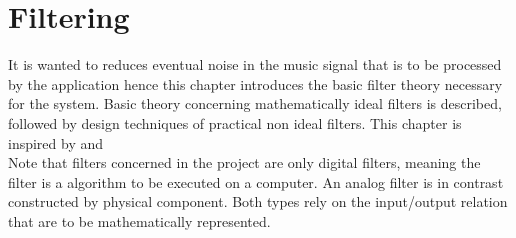 \chapter{Filtering} \label{ch7}
It is wanted to reduces eventual noise in the music signal that is to be processed by the application hence this chapter introduces the basic filter theory necessary for the system. Basic theory concerning mathematically ideal filters is described, followed by design techniques of practical non ideal filters. This chapter is inspired by \cite{DTSP, ch. 5,7} and \cite{FSP, sec. 3.4.4}\\
Note that filters concerned in the project are only digital filters, meaning the filter is a algorithm to be executed on a computer. An analog filter is in contrast constructed by physical component. Both types rely on the input/output relation that are to be mathematically represented.     

